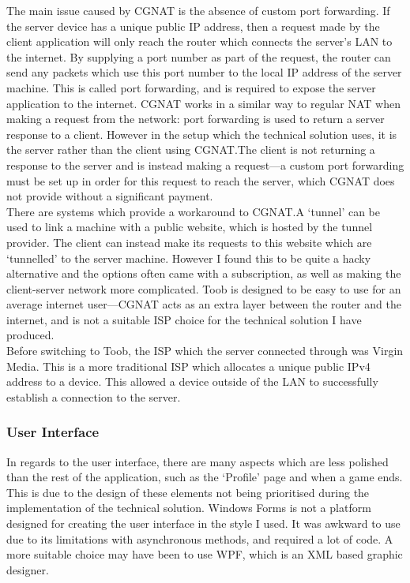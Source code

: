\documentclass{article}
\begin{document}
The main issue caused by CGNAT is the absence of custom port forwarding. If the server device has a unique public IP address, then a request made by the client application will only reach the router which connects the server's LAN to the internet. By supplying a port number as part of the request, the router can send any packets which use this port number to the local IP address of the server machine. This is called port forwarding, and is required to expose the server application to the internet. CGNAT works in a similar way to regular NAT when making a request from the network: port forwarding is used to return a server response to a client. However in the setup which the technical solution uses, it is the server rather than the client using CGNAT.\@ The client is not returning a response to the server and is instead making a request---a custom port forwarding must be set up in order for this request to reach the server, which CGNAT does not provide without a significant payment. \\

There are systems which provide a workaround to CGNAT.\@ A `tunnel' can be used to link a machine with a public website, which is hosted by the tunnel provider. The client can instead make its requests to this website which are `tunnelled' to the server machine. However I found this to be quite a hacky alternative and the options often came with a subscription, as well as making the client-server network more complicated. Toob is designed to be easy to use for an average internet user---CGNAT acts as an extra layer between the router and the internet, and is not a suitable ISP choice for the technical solution I have produced. \\

Before switching to Toob, the ISP which the server connected through was Virgin Media. This is a more traditional ISP which allocates a unique public IPv4 address to a device. This allowed a device outside of the LAN to successfully establish a connection to the server.

\subsubsection{User Interface}

In regards to the user interface, there are many aspects which are less polished than the rest of the application, such as the `Profile' page and when a game ends. This is due to the design of these elements not being prioritised during the implementation of the technical solution. Windows Forms is not a platform designed for creating the user interface in the style I used. It was awkward to use due to its limitations with asynchronous methods, and required a lot of code. A more suitable choice may have been to use WPF, which is an XML based graphic designer. \\
\end{document}
